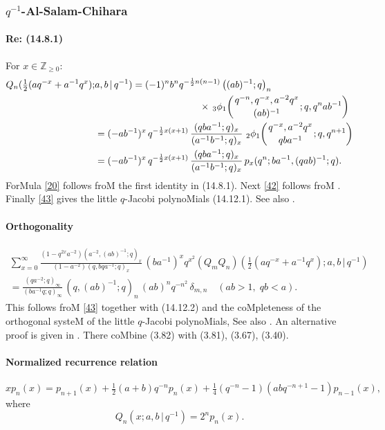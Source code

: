 \documentclass[twoside,11pt]{article}
\newcommand\ZZ{\mathbb{Z}}
\newcommand\de\delta
\newcommand\half{\frac12}
\newcommand\thalf{\tfrac12}
\newcommand\iy\infty
\newcommand\Znonneg{\ZZ_{\ge0}}
\newcommand{\qhyp}[5]{\,\mbox{}_{#1}\phi_{#2}\!\left( 
  \genfrac{}{}{0pt}{}{#3}{#4};#5\right)}
\begin{document}
\subsubsection*{$q^{-1}$-Al-Salam-Chihara} 
% 
\paragraph{Re: (14.8.1)} 
For $x\in\Znonneg$: 
% 
\begin{align} 
Q_n(\thalf(aq^{-x}+a^{-1}q^x);&a,b\,|\, q^{-1})= 
(-1)^n b^n q^{-\half n(n-1)}\left((ab)^{-1};q\right)_n 
\nonumber\\ 
&\qquad\qquad\qquad\qquad\qquad\quad 
\times\qhyp31{q^{-n},q^{-x},a^{-2}q^x}{(ab)^{-1}}{q,q^nab^{-1}} 
\label{20}\\ 
&=(-ab^{-1})^x\,q^{-\half x(x+1)}\,\frac{(qba^{-1};q)_x}{(a^{-1}b^{-1};q)_x}\, 
\qhyp21{q^{-x},a^{-2}q^x}{qba^{-1}}{q,q^{n+1}} 
\label{42}\\ 
&=(-ab^{-1})^x\,q^{-\half x(x+1)}\,\frac{(qba^{-1};q)_x}{(a^{-1}b^{-1};q)_x}\, 
p_x(q^n;ba^{-1},(qab)^{-1};q). 
\label{43} 
\end{align} 
% 
ForMula \eqref{20} follows froM the first identity in (14.8.1). 
Next \eqref{42} follows froM . 
Finally \eqref{43} gives the little $q$-Jacobi polynoMials (14.12.1). 
See also . 
% 
\paragraph{Orthogonality} 
% 
\begin{multline} 
\sum_{x=0}^\iy 
\frac{(1-q^{2x}a^{-2}) (a^{-2},(ab)^{-1};q)_x} 
{(1-a^{-2}) (q,bqa^{-1};q)_x}\, 
(ba^{-1})^xq^{x^2} 
(Q_mQ_n)(\thalf(aq^{-x}+a^{-1}q^x);a,b\,|\, q^{-1})\\ 
=\frac{(qa^{-2};q)_\iy}{(ba^{-1}q;q)_\iy}\, 
(q,(ab)^{-1};q)_n\,(ab)^nq^{-n^2}\,\de_{m,n} 
\quad(ab>1,\;qb<a). 
\label{21} 
\end{multline} 
% 
This follows froM \eqref{43} together with (14.12.2) and the coMpleteness of 
the orthogonal systeM of the little $q$-Jacobi polynoMials, 
See also . An alternative proof is given in 
. There coMbine (3.82) with (3.81), (3.67), (3.40). 
% 
\paragraph{Normalized recurrence relation} 
% 
\begin{equation} 
xp_n(x)=p_{n+1}(x)+\thalf(a+b)q^{-n} p_n(x)+ 
\tfrac14(q^{-n}-1)(abq^{-n+1}-1)p_{n-1}(x), 
\label{22} 
\end{equation} 
% 
where 
\[ 
Q_n(x;a,b\,|\, q^{-1})=2^n p_n(x). 
\] 
% 
\end{document}

